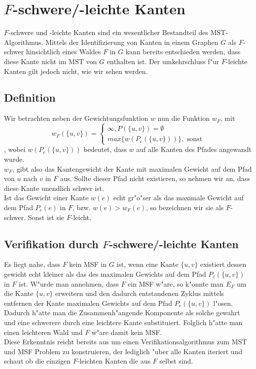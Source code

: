 \section{$F$-schwere/-leichte Kanten}

$F$-schwere und -leichte Kanten sind ein wesentlicher Bestandteil des 
    MST-Algorithmus. Mittels der Identifizierung von Kanten in einem Graphen $G$
    als $F$-schwer hinsichtlich eines Waldes $F$ in $G$ kann
    bereits entschieden werden, dass diese Kante nicht im MST von $G$ enthalten
    ist. Der umkehrschluss f"ur $F$-leichte Kanten gilt jedoch nicht, wie wir
    sehen werden.\\

\subsection{Definition}

Wir betrachten neben der Gewichtungsfunktion $w$ nun die Funktion $w_F$, mit
    $$
    w_F(\{u,v\}) =  \begin{cases}
                        \infty, P(\{u,v\}) = \emptyset\\
                        max\{w(P_e(\{u,v\}))\}, \text{ sonst}
                    \end{cases}
    $$
, wobei $w(P_e(\{u,v\}))$ bedeutet, dass $w$ auf alle Kanten des Pfades angewandt
    wurde.\\
$w_F$, gibt also das Kantengewicht der Kante mit maximalen Gewicht auf dem
    Pfad von $u$ nach $v$ in $F$ aus. Sollte dieser Pfad nicht existieren, so
    nehmen wir an, dass diese Kante unendlich schwer ist.\\
Ist das Gewicht einer Kante $w(e)$ echt gr"o"ser als das maximale Gewicht auf dem 
    Pfad $P_e(e)$ in $F$, bzw. $w(e) > w_F(e)$, 
    so bezeichnen wir sie als $F$-schwer.
    Sonst ist sie $F$-leicht.

\subsection{Verifikation durch $F$-schwere/-leichte Kanten}

Es liegt nahe, dass $F$ kein MSF in $G$ ist, wenn eine Kante $\{u,v\}$ 
    existiert dessen gewicht echt kleiner als das des maximalen Gewichts auf dem
    Pfad $P_e(\{u,v\})$ in $F$ ist. W"urde man annehmen, dass $F$ ein MSF w"are, 
    so k"onnte man $E_F$ um die Kante $\{u,v\}$ erweitern und den dadurch 
    entstandenen Zyklus mittels entfernen der Kante maximalen Gewichts auf dem
    Pfad $P_e(\{u,v\})$ l"osen. Dadurch h"atte man die Zusammenh"angende 
    Komponente als solche gewahrt und eine schwerere durch eine leichtere Kante
    substituiert. Folglich h"atte man einen leichteren Wald und $F$ w"are damit
    kein MSF.\\
Diese Erkenntnis reicht bereits aus um einen Verifikationsalgorithmus zum 
    MST und MSF Problem zu konstruieren, der lediglich "uber alle Kanten 
    iteriert und schaut ob die einzigen $F$-leichten Kanten die aus $F$ selbst
    sind.\\

